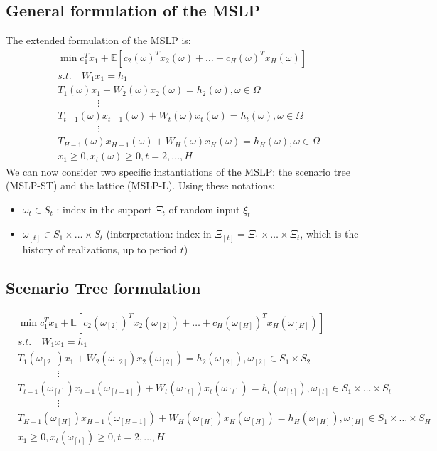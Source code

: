 \documentclass[12pt, openany]{report}
\newcommand{\E}{\mathbb{E}}
\theoremstyle{definition}
\begin{document}
\subsection{General formulation of the MSLP}
The extended formulation of the MSLP is: 
\begin{equation}
	\begin{aligned}
		&\min c_1^Tx_1 + \E[c_2(\omega)^T x_2(\omega)+ \dots + c_H(\omega)^Tx_H(\omega)]\\
		&s.t. \quad W_1x_1 = h_1\\
		&T_1(\omega)x_1 + W_2(\omega)x_2(\omega) = h_2(\omega), \omega \in \Omega\\
		&\qquad \qquad \vdots\\
		&T_{t-1}(\omega)x_{t-1}(\omega) + W_t(\omega)x_t(\omega) = h_t(\omega), \omega \in \Omega\\
		&\qquad \qquad \vdots\\
		&T_{H-1}(\omega)x_{H-1}(\omega) + W_H(\omega)x_H(\omega) = h_H(\omega), \omega \in \Omega\\
		&x_1 \geq 0, x_t(\omega) \geq 0, t=2, \dots, H
	\end{aligned}
\end{equation}
We can now consider two specific instantiations of the MSLP: the scenario tree (MSLP-ST) and the lattice (MSLP-L). Using these notations:
\begin{itemize}
	\item $\omega_t \in S_t$ : index in the support $\Xi_t$ of random input $\xi_t$
	\item $\omega_{[t]} \in S_1 \times \dots \times S_t$ (interpretation: index in $\Xi_{[t]} = \Xi_1 \times \dots \times \Xi_t$, which is the history of realizations, up to period $t$)
\end{itemize}
\subsection{Scenario Tree formulation}
\begin{equation}\label{eq:scenario_tree}
	 \begin{aligned}
		&\min c_1^Tx_1 + \E\left[c_2(\omega_{[2]})^T x_2(\omega_{[2]})+ \dots + c_H(\omega_{[H]})^Tx_H(\omega_{[H]})\right]\\
		&s.t. \quad W_1x_1 = h_1\\
		&T_1(\omega_{[2]})x_1 + W_2(\omega_{[2]})x_2(\omega_{[2]}) = h_2(\omega_{[2]}), \omega_{[2]} \in S_1 \times S_2\\
		&\qquad \qquad \vdots\\
		&T_{t-1}(\omega_{[t]})x_{t-1}(\omega_{[t-1]}) + W_t(\omega_{[t]})x_t(\omega_{[t]}) = h_t(\omega_{[t]}), \omega_{[t]} \in S_1 \times \dots \times S_t\\
		&\qquad \qquad \vdots\\
		&T_{H-1}(\omega_{[H]})x_{H-1}(\omega_{[H-1]}) + W_H(\omega_{[H]})x_H(\omega_{[H]}) = h_H(\omega_{[H]}), \omega_{[H]} \in S_1 \times \dots \times S_H\\
		&x_1 \geq 0, x_t(\omega_{[t]}) \geq 0, t=2, \dots, H
	 \end{aligned}
\end{equation}
\end{document}
